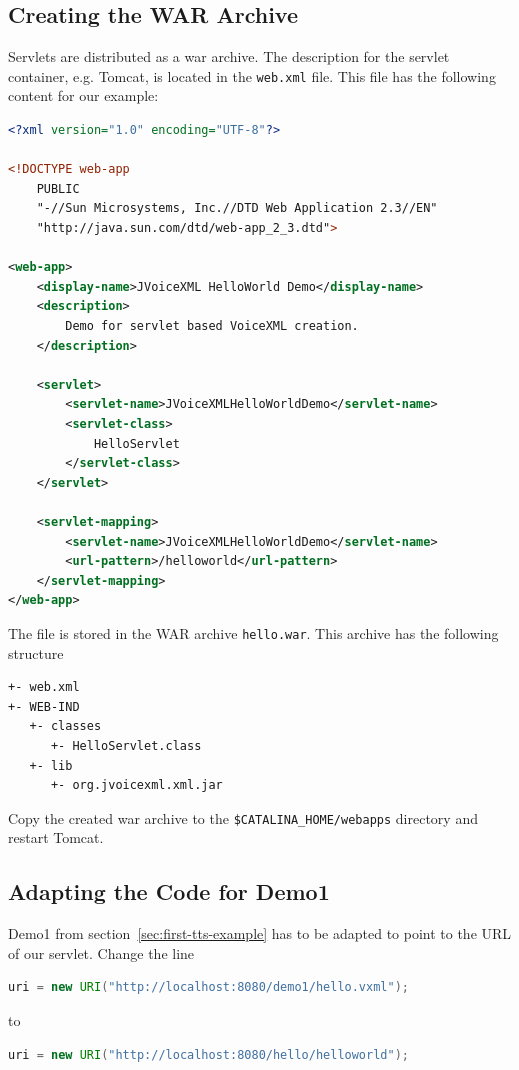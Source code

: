 \documentclass[11pt,a4paper]{book}
\begin{document}
\subsection{Creating the WAR Archive}

Servlets are distributed as a war archive. The description for the servlet
container, e.g. Tomcat, is located in the \texttt{web.xml} file.
This file has the following content for our example:

\begin{lstlisting}[language=XML]
<?xml version="1.0" encoding="UTF-8"?>

<!DOCTYPE web-app
    PUBLIC
    "-//Sun Microsystems, Inc.//DTD Web Application 2.3//EN"
    "http://java.sun.com/dtd/web-app_2_3.dtd">

<web-app>
    <display-name>JVoiceXML HelloWorld Demo</display-name>
    <description>
        Demo for servlet based VoiceXML creation.
    </description>

    <servlet>
        <servlet-name>JVoiceXMLHelloWorldDemo</servlet-name>
        <servlet-class>
            HelloServlet
        </servlet-class>
    </servlet>

    <servlet-mapping>
        <servlet-name>JVoiceXMLHelloWorldDemo</servlet-name>
        <url-pattern>/helloworld</url-pattern>
    </servlet-mapping>
</web-app>
\end{lstlisting}

The file is stored in the WAR archive \texttt{hello.war}. This archive has the
following structure
\begin{lstlisting}
+- web.xml
+- WEB-IND
   +- classes
      +- HelloServlet.class
   +- lib
      +- org.jvoicexml.xml.jar
\end{lstlisting}

Copy the created war archive to the \texttt{\$CATALINA\_HOME/webapps}
directory and restart Tomcat.

\subsection{Adapting the Code for Demo1}

Demo1 from section~\ref{sec:first-tts-example} has to be adapted to point to
the URL of our servlet. Change the line
\begin{lstlisting}[language=Java]
uri = new URI("http://localhost:8080/demo1/hello.vxml");
\end{lstlisting}
to
\begin{lstlisting}[language=Java]
uri = new URI("http://localhost:8080/hello/helloworld");
\end{lstlisting}
\end{document}
